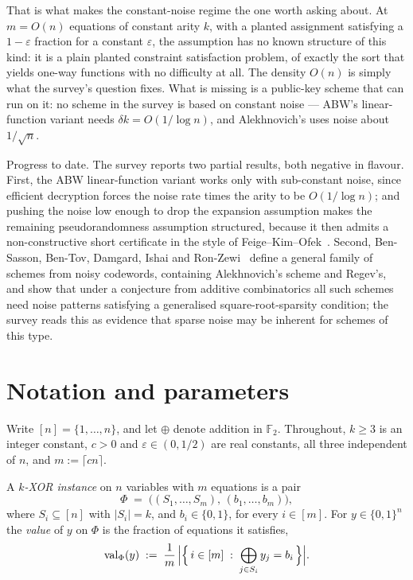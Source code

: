 \documentclass{aicr-conjecture}
\newcommand{\bits}{\{0,1\}}
\newcommand{\val}{\mathrm{val}}
\begin{document}
That is what makes the constant-noise regime the one worth asking
about. At $m = O(n)$ equations of constant arity $k$, with a planted
assignment satisfying a $1-\varepsilon$ fraction for a constant
$\varepsilon$, the assumption has no known structure of this kind: it
is a plain planted constraint satisfaction problem, of exactly the sort
that yields one-way functions with no difficulty at all. The density
$O(n)$ is simply what the survey's question fixes. What is missing is a
public-key scheme that can run on it: no scheme in the survey is based
on constant noise --- ABW's linear-function variant needs
$\delta k = O(1/\log n)$, and Alekhnovich's uses noise about
$1/\sqrt{n}$.

Progress to date. The survey reports two partial results, both negative
in flavour. First, the ABW linear-function variant works only with
sub-constant noise, since efficient decryption forces the noise rate
times the arity to be $O(1/\log n)$; and pushing the noise low enough
to drop the expansion assumption makes the remaining pseudorandomness
assumption structured, because it then admits a non-constructive short
certificate in the style of Feige--Kim--Ofek~\cite{FKO06}. Second,
Ben-Sasson, Ben-Tov, Damgard, Ishai and Ron-Zewi~\cite{BBD16} define a
general family of schemes from noisy codewords, containing
Alekhnovich's scheme and Regev's, and show that under a conjecture from
additive combinatorics all such schemes need noise patterns satisfying
a generalised square-root-sparsity condition; the survey reads this as
evidence that sparse noise may be inherent for schemes of this type.

\section{Notation and parameters}\label{sec:notation}

Write $[n] = \{1,\dots,n\}$, and let $\oplus$ denote addition in
$\mathbb{F}_2$. Throughout, $k \ge 3$ is an integer constant, $c > 0$
and $\varepsilon \in (0,1/2)$ are real constants, all three independent
of $n$, and $m := \lceil c n \rceil$.

A \emph{$k$-XOR instance} on $n$ variables with $m$ equations is a pair
\[
  \Phi \;=\; \bigl( (S_1,\dots,S_m),\, (b_1,\dots,b_m) \bigr),
\]
where $S_i \subseteq [n]$ with $|S_i| = k$, and $b_i \in \bits$, for
every $i \in [m]$. For $y \in \bits^n$ the \emph{value} of $y$ on
$\Phi$ is the fraction of equations it satisfies,
\[
  \val_\Phi(y) \;:=\; \frac{1}{m}\,
  \Bigl|\Bigl\{\, i \in [m] \;:\; \bigoplus_{j \in S_i} y_j = b_i
  \,\Bigr\}\Bigr| .
\]
\end{document}

